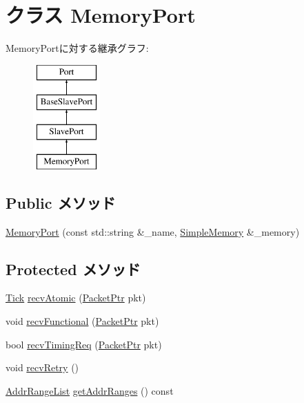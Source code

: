 \hypertarget{classSimpleMemory_1_1MemoryPort}{
\section{クラス MemoryPort}
\label{classSimpleMemory_1_1MemoryPort}
}
MemoryPortに対する継承グラフ:\begin{figure}[H]
\begin{center}
\leavevmode
\includegraphics[height=4cm]{classSimpleMemory_1_1MemoryPort}
\end{center}
\end{figure}
\subsection*{Public メソッド}
\begin{DoxyCompactItemize}
\item 
\hyperlink{classSimpleMemory_1_1MemoryPort_ae97acd31fada9d8bd39445f55ed4febc}{MemoryPort} (const std::string \&\_\-name, \hyperlink{classSimpleMemory_1_1SimpleMemory}{SimpleMemory} \&\_\-memory)
\end{DoxyCompactItemize}
\subsection*{Protected メソッド}
\begin{DoxyCompactItemize}
\item 
\hyperlink{base_2types_8hh_a5c8ed81b7d238c9083e1037ba6d61643}{Tick} \hyperlink{classSimpleMemory_1_1MemoryPort_a5f0b4c4a94f6b0053f9d7a4eb9c2518a}{recvAtomic} (\hyperlink{classPacket}{PacketPtr} pkt)
\item 
void \hyperlink{classSimpleMemory_1_1MemoryPort_aeefa907fb6d6a787e6dab90e8138ea90}{recvFunctional} (\hyperlink{classPacket}{PacketPtr} pkt)
\item 
bool \hyperlink{classSimpleMemory_1_1MemoryPort_a3344d9dd0f83257feab5424e761f31c6}{recvTimingReq} (\hyperlink{classPacket}{PacketPtr} pkt)
\item 
void \hyperlink{classSimpleMemory_1_1MemoryPort_a29cb5a4f98063ce6e9210eacbdb35298}{recvRetry} ()
\item 
\hyperlink{classstd_1_1list}{AddrRangeList} \hyperlink{classSimpleMemory_1_1MemoryPort_a36cf113d5e5e091ebddb32306c098fae}{getAddrRanges} () const 
\end{DoxyCompactItemize}
